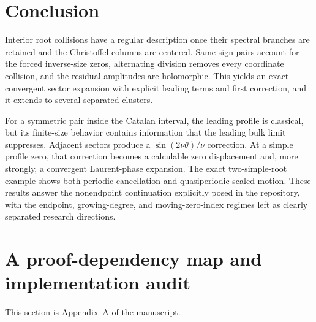 \documentclass[11pt,a4paper]{article}
\numberwithin{equation}{section}
\theoremstyle{definition}
\theoremstyle{remark}
\begin{document}
\section{Conclusion}\label{ic:sec:conclusion}
Interior root collisions have a regular description once their spectral
branches are retained and the Christoffel columns are centered. Same-sign
pairs account for the forced inverse-size zeros, alternating division
removes every coordinate collision, and the residual amplitudes are
holomorphic. This yields an exact convergent sector expansion with
explicit leading terms and first correction, and it extends to several
separated clusters.

For a symmetric pair inside the Catalan interval, the leading profile is
classical, but its finite-size behavior contains information that the
leading bulk limit suppresses. Adjacent sectors produce a
$\sin(2\nu\theta)/\nu$ correction. At a simple profile zero, that
correction becomes a calculable zero displacement and, more strongly, a
convergent Laurent-phase expansion. The exact two-simple-root example
shows both periodic cancellation and quasiperiodic scaled motion. These
results answer the nonendpoint continuation explicitly posed in the
repository, with the endpoint, growing-degree, and moving-zero-index
regimes left as clearly separated research directions.

\section{A proof-dependency map and implementation audit}\label{ic:app:dependency}

This section is Appendix~A of the manuscript.
\end{document}
